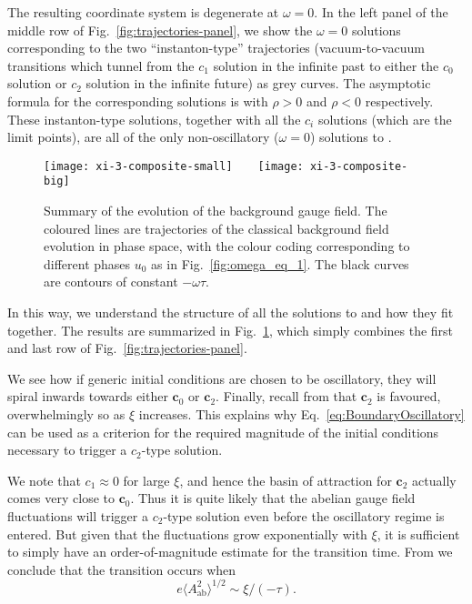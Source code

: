 The resulting coordinate system is degenerate at $\omega=0$. In the left panel of the middle row of Fig.~\ref{fig:trajectories-panel}, we show the $\omega=0$ solutions corresponding to the two ``instanton-type'' trajectories (vacuum-to-vacuum transitions which tunnel from the $c_{1}$ solution in the infinite past to either the $c_{0}$ solution or $c_{2}$ solution in the infinite future) as grey curves. The asymptotic formula for the corresponding solutions is  with $\rho>0$ and $\rho<0$ respectively. These instanton-type solutions, together with all the $c_{i}$ solutions (which are the limit points), are all of the only non-oscillatory ($\omega=0$) solutions to . 
\begin{figure}
\begin{centering}
\texttt{[image: xi-3-composite-small]}$\qquad$\texttt{[image: xi-3-composite-big]} 
\par\end{centering}
\caption{\label{fig:rainbow} Summary of the evolution of the background gauge field. The coloured lines are trajectories of the classical background field evolution in phase space, with the colour coding corresponding to different phases $u_{0}$ as in Fig.~\ref{fig:omega_eq_1}. The black curves are contours of constant $-\omega\tau$. }
\end{figure}

In this way, we understand the structure of all the solutions to  and how they fit together. The results are summarized in Fig.~\ref{fig:rainbow}, which simply combines the first and last row of Fig.~\ref{fig:trajectories-panel}.

We see how if generic initial conditions are chosen to be oscillatory, they will spiral inwards towards either $\mathbf{c}_{0}$ or $\mathbf{c}_{2}$. Finally, recall from  that $\mathbf{c}_{2}$ is favoured, overwhelmingly so as $\xi$ increases. This explains why Eq.~\eqref{eq:BoundaryOscillatory} can be used as a criterion for the required magnitude of the initial conditions necessary to trigger a $c_{2}$\nobreakdash-type solution.

We note that $c_{1}\approx0$ for large $\xi$, and hence the basin of attraction for $\mathbf{c}_{2}$ actually comes very close to $\mathbf{c}_{0}$. Thus it is quite likely that the abelian gauge field fluctuations will trigger a $c_{2}$\nobreakdash-type solution even before the oscillatory regime is entered. But given that the fluctuations grow exponentially with $\xi$, it is sufficient to simply have an order-of-magnitude estimate for the transition time. From  we conclude that the transition occurs when 
\begin{equation}
e\langle A_{\text{ab}}^{2}\rangle^{1/2}\sim\xi/(-\tau).\label{eq:transition-time}
\end{equation}
  


